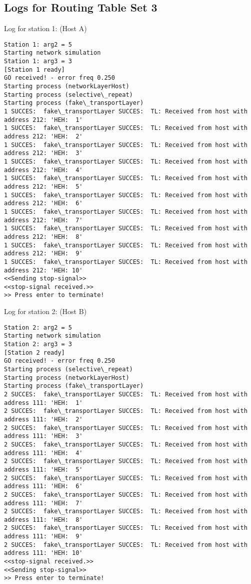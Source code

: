 \subsection{Logs for Routing Table Set 3}
Log for station 1: (Host A)
\begin{lstlisting}[breaklines=true]
Station 1: arg2 = 5
Starting network simulation
Station 1: arg3 = 3
[Station 1 ready]
GO received! - error freq 0.250
Starting process (networkLayerHost)
Starting process (selective\_repeat)
Starting process (fake\_transportLayer)
1 SUCCES:  fake\_transportLayer SUCCES:  TL: Received from host with address 212: 'HEH:  1'
1 SUCCES:  fake\_transportLayer SUCCES:  TL: Received from host with address 212: 'HEH:  2'
1 SUCCES:  fake\_transportLayer SUCCES:  TL: Received from host with address 212: 'HEH:  3'
1 SUCCES:  fake\_transportLayer SUCCES:  TL: Received from host with address 212: 'HEH:  4'
1 SUCCES:  fake\_transportLayer SUCCES:  TL: Received from host with address 212: 'HEH:  5'
1 SUCCES:  fake\_transportLayer SUCCES:  TL: Received from host with address 212: 'HEH:  6'
1 SUCCES:  fake\_transportLayer SUCCES:  TL: Received from host with address 212: 'HEH:  7'
1 SUCCES:  fake\_transportLayer SUCCES:  TL: Received from host with address 212: 'HEH:  8'
1 SUCCES:  fake\_transportLayer SUCCES:  TL: Received from host with address 212: 'HEH:  9'
1 SUCCES:  fake\_transportLayer SUCCES:  TL: Received from host with address 212: 'HEH: 10'
<<Sending stop-signal>>
<<stop-signal received.>>
>> Press enter to terminate!
\end{lstlisting}

Log for station 2: (Host B)
\begin{lstlisting}[breaklines=true]
Station 2: arg2 = 5
Starting network simulation
Station 2: arg3 = 3
[Station 2 ready]
GO received! - error freq 0.250
Starting process (selective\_repeat)
Starting process (networkLayerHost)
Starting process (fake\_transportLayer)
2 SUCCES:  fake\_transportLayer SUCCES:  TL: Received from host with address 111: 'HEH:  1'
2 SUCCES:  fake\_transportLayer SUCCES:  TL: Received from host with address 111: 'HEH:  2'
2 SUCCES:  fake\_transportLayer SUCCES:  TL: Received from host with address 111: 'HEH:  3'
2 SUCCES:  fake\_transportLayer SUCCES:  TL: Received from host with address 111: 'HEH:  4'
2 SUCCES:  fake\_transportLayer SUCCES:  TL: Received from host with address 111: 'HEH:  5'
2 SUCCES:  fake\_transportLayer SUCCES:  TL: Received from host with address 111: 'HEH:  6'
2 SUCCES:  fake\_transportLayer SUCCES:  TL: Received from host with address 111: 'HEH:  7'
2 SUCCES:  fake\_transportLayer SUCCES:  TL: Received from host with address 111: 'HEH:  8'
2 SUCCES:  fake\_transportLayer SUCCES:  TL: Received from host with address 111: 'HEH:  9'
2 SUCCES:  fake\_transportLayer SUCCES:  TL: Received from host with address 111: 'HEH: 10'
<<stop-signal received.>>
<<Sending stop-signal>>
>> Press enter to terminate!
\end{lstlisting}


